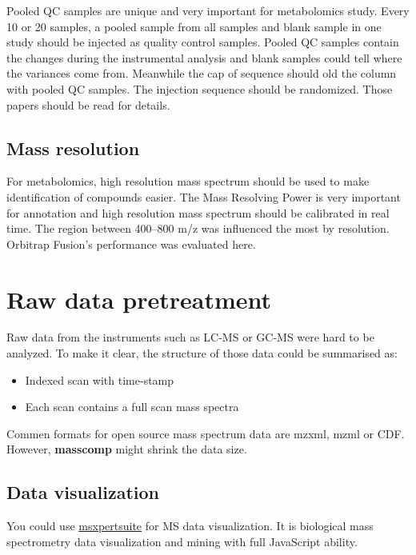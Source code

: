 \documentclass[
]{book}
\begin{document}
Pooled QC samples are unique and very important for metabolomics study. Every 10 or 20 samples, a pooled sample from all samples and blank sample in one study should be injected as quality control samples. Pooled QC samples contain the changes during the instrumental analysis and blank samples could tell where the variances come from. Meanwhile the cap of sequence should old the column with pooled QC samples. The injection sequence should be randomized. Those papers\citep{dunn2012, broadhurst2018} should be read for details.

\hypertarget{mass-resolution}{%
\section{Mass resolution}\label{mass-resolution}}

For metabolomics, high resolution mass spectrum should be used to make identification of compounds easier. The Mass Resolving Power is very important for annotation and high resolution mass spectrum should be calibrated in real time. The region between 400--800 m/z was influenced the most by resolution\citep{najdekr2016}. Orbitrap Fusion's performance was evaluated here\citep{barbiersainthilaire2018}.

\hypertarget{raw-data-pretreatment}{%
\chapter{Raw data pretreatment}\label{raw-data-pretreatment}}

Raw data from the instruments such as LC-MS or GC-MS were hard to be analyzed. To make it clear, the structure of those data could be summarised as:

\begin{itemize}
\item
  Indexed scan with time-stamp
\item
  Each scan contains a full scan mass spectra
\end{itemize}

Commen formats for open source mass spectrum data are mzxml, mzml or CDF. However, \textbf{masscomp} might shrink the data size\citep{yang2019b}.

\hypertarget{data-visualization}{%
\section{Data visualization}\label{data-visualization}}

You could use \href{https://salsa.debian.org/debichem-team/msxpertsuite}{msxpertsuite} for MS data visualization. It is biological mass spectrometry data visualization and mining with full JavaScript ability\citep{rusconi2019}.
\end{document}
